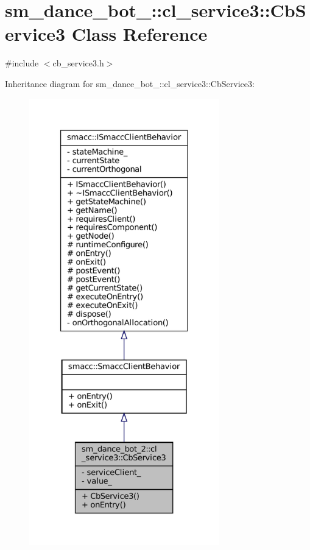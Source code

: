 \hypertarget{classsm__dance__bot__2_1_1cl__service3_1_1CbService3}{}\section{sm\+\_\+dance\+\_\+bot\+\_\+:\+:cl\+\_\+service3\+:\+:Cb\+Service3 Class Reference}
\label{classsm__dance__bot__2_1_1cl__service3_1_1CbService3}


{\ttfamily \#include $<$cb\+\_\+service3.\+h$>$}



Inheritance diagram for sm\+\_\+dance\+\_\+bot\+\_\+:\+:cl\+\_\+service3\+:\+:Cb\+Service3\+:
\nopagebreak
\begin{figure}[H]
\begin{center}
\leavevmode
\includegraphics[height=550pt]{classsm__dance__bot__2_1_1cl__service3_1_1CbService3__inherit__graph}
\end{center}
\end{figure}


